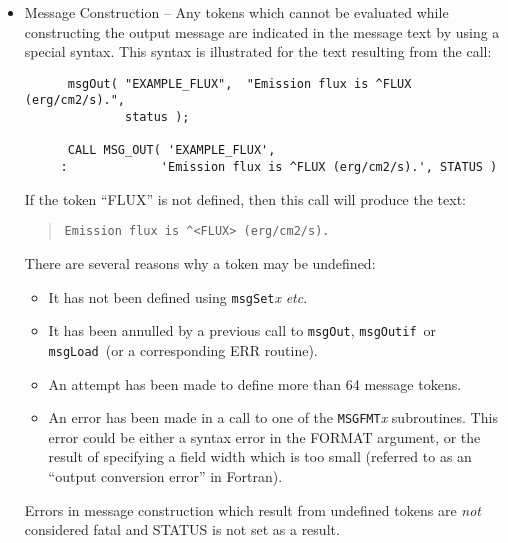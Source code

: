 \documentclass[twoside,11pt]{article}
\renewcommand{\_}{\texttt{\symbol{95}}}
\newcommand{\func}[1]{\texttt{#1}}
\newcommand{\msgload}{\func{msgLoad}}
\newcommand{\msgout}{\func{msgOut}}
\newcommand{\msgoutif}{\func{msgOutif}}
\begin{document}
\begin {itemize}
\item Message Construction -- Any tokens which cannot be evaluated while
constructing the output message are indicated in the message text by using a
special syntax.
This syntax is illustrated for the text resulting from the call:

\begin {small}
\begin{verbatim}
      msgOut( "EXAMPLE_FLUX",  "Emission flux is ^FLUX (erg/cm2/s).",
              status );

      CALL MSG_OUT( 'EXAMPLE_FLUX',
     :             'Emission flux is ^FLUX (erg/cm2/s).', STATUS )
\end{verbatim}
\end {small}

If the token ``FLUX'' is not defined, then this call will produce the text:

\begin {quote}
\begin {small}
\begin{verbatim}
Emission flux is ^<FLUX> (erg/cm2/s).
\end{verbatim}
\end {small}
\end {quote}

There are several reasons why a token may be undefined:

\begin {itemize}
\item It has not been defined using \func{msgSet}\textit{x} \textit{etc}.

\item It has been annulled by a previous call to \msgout, \msgoutif\ or
\msgload\ (or a corresponding ERR routine).

\item An attempt has been made to define more than 64 message tokens.

\item An error has been made in a call to one of the \func{MSG\_FMT}\textit{x}
subroutines.
This error could be either a syntax error in the FORMAT argument, or the
result of specifying a field width which is too small (referred to
as an ``output conversion error'' in Fortran).
\end {itemize}

Errors in message construction which result from undefined tokens are \emph{not}
considered fatal and STATUS is not set as a result.


\end{itemize}
\end{document}

